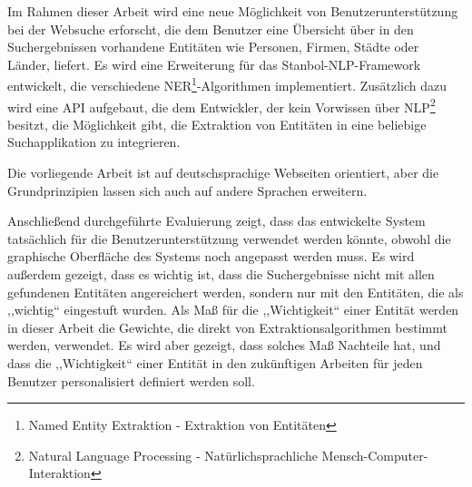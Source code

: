 Im Rahmen dieser Arbeit wird eine neue Möglichkeit von Benutzerunterstützung bei der Websuche erforscht, die dem Benutzer eine Übersicht über in den Suchergebnissen vorhandene Entitäten wie Personen, Firmen, Städte oder Länder, liefert. Es wird eine Erweiterung für das Stanbol-NLP-Framework entwickelt, die verschiedene NER\footnote{Named Entity Extraktion - Extraktion von Entitäten}-Algorithmen implementiert. Zusätzlich dazu wird eine API aufgebaut, die dem Entwickler, der kein Vorwissen über NLP\footnote{Natural Language Processing - Natürlichsprachliche Mensch-Computer-Interaktion} besitzt, die Möglichkeit gibt, die Extraktion von Entitäten in eine beliebige Suchapplikation zu integrieren. 

Die vorliegende Arbeit ist auf deutschsprachige Webseiten orientiert, aber die Grundprinzipien lassen sich auch auf andere Sprachen erweitern.

Anschließend durchgeführte Evaluierung zeigt, dass das entwickelte System tatsächlich für die Benutzerunterstützung verwendet werden könnte, obwohl die graphische Oberfläche des Systems noch angepasst werden muss. Es wird außerdem gezeigt, dass es wichtig ist, dass die Suchergebnisse nicht mit allen gefundenen Entitäten angereichert werden, sondern nur mit den Entitäten, die als ,,wichtig`` eingestuft wurden. Als Maß für die ,,Wichtigkeit`` einer Entität werden in dieser Arbeit die Gewichte, die direkt von Extraktionsalgorithmen bestimmt werden, verwendet. Es wird aber gezeigt, dass solches Maß Nachteile hat, und dass die ,,Wichtigkeit`` einer Entität in den zukünftigen Arbeiten für jeden Benutzer personalisiert definiert werden soll.